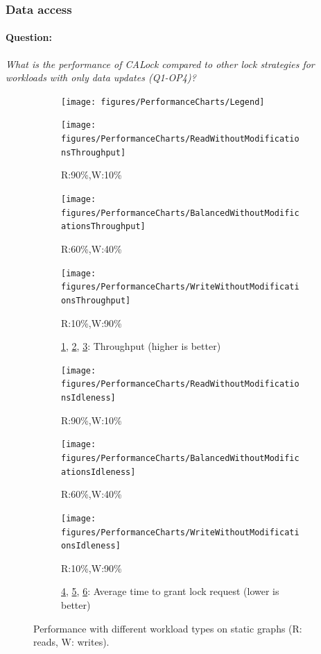 \subsubsection{Data access} \label{benchmark:StaticOverallPerf}
\paragraph{Question:} \emph{What is the performance of CALock compared to other lock strategies for workloads with only data updates (Q1-OP4)?}


\begin{figure}
	\centering
	\captionsetup{justification=centering}
	\begin{subfigure}[b]{\textwidth}
		\centering
		\texttt{[image: figures/PerformanceCharts/Legend]}
	\end{subfigure}
	\begin{subfigure}{.33\textwidth}
		\texttt{[image: figures/PerformanceCharts/ReadWithoutModificationsThroughput]}
		\caption{R:90\%,W:10\%}
		\label{rwm}
	\end{subfigure}
	\begin{subfigure}{.32\textwidth}
		\texttt{[image: figures/PerformanceCharts/BalancedWithoutModificationsThroughput]}
		\caption{R:60\%,W:40\%}
		\label{bwm}
	\end{subfigure}
	\begin{subfigure}{.32\textwidth}
		\texttt{[image: figures/PerformanceCharts/WriteWithoutModificationsThroughput]}
		\caption{R:10\%,W:90\%}
		\label{wwm}
	\end{subfigure}
	\begin{subfigure}[b]{\textwidth}
		\caption*{\cref{rwm}, \cref{bwm}, \cref{wwm}: Throughput (higher is better)}
	\end{subfigure}


	\begin{subfigure}[b]{.33\textwidth}
		\texttt{[image: figures/PerformanceCharts/ReadWithoutModificationsIdleness]}
		\caption{R:90\%,W:10\%}
		\label{irwm}
	\end{subfigure}
	\begin{subfigure}[b]{.32\textwidth}
		\texttt{[image: figures/PerformanceCharts/BalancedWithoutModificationsIdleness]}
		\caption{R:60\%,W:40\%}
		\label{ibwm}
	\end{subfigure}
	\begin{subfigure}[b]{.32\textwidth}
		\texttt{[image: figures/PerformanceCharts/WriteWithoutModificationsIdleness]}
		\caption{R:10\%,W:90\%}
		\label{iwwm}
	\end{subfigure}
	\begin{subfigure}[b]{\textwidth}
		\caption*{\cref{irwm}, \cref{ibwm}, \cref{iwwm}: Average time to grant lock request (lower is better)}
	\end{subfigure}



	\caption{Performance with different workload types on static graphs (R: reads, W: writes).}
	\label{staticPerf}
	\end{figure}
